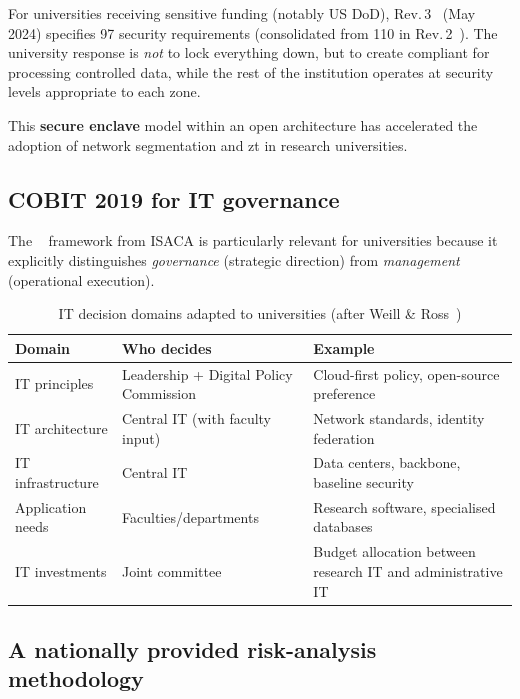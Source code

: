 For universities receiving sensitive funding (notably
US DoD),  Rev.\,3~\cite{nist-171r3} (May 2024) specifies
97 security requirements (consolidated from 110 in Rev.\,2~\cite{nist-171}). The university response is \emph{not}
to lock everything down, but to create compliant 
for processing controlled data, while the rest of
the institution operates at security levels appropriate to each zone.

This \textbf{secure enclave} model within an open architecture
has accelerated the adoption of network segmentation and \gls{zt}
in research universities.

\subsection{COBIT 2019 for IT governance}

The ~\cite{cobit} framework from ISACA is
particularly relevant for universities because it explicitly
distinguishes \emph{governance} (strategic direction) from
\emph{management} (operational execution).

\begin{table}[H]
\centering
\caption{IT decision domains adapted to universities (after Weill
\& Ross~\cite{weill-ross})}
\label{tab:cobit}
\small
\begin{tabularx}{\textwidth}{l l X}
\toprule
\textbf{Domain} & \textbf{Who decides} & \textbf{Example} \\
\midrule
IT principles & Leadership + Digital Policy Commission & Cloud-first policy,
    open-source preference \\
\addlinespace
IT architecture & Central IT (with faculty input) & Network standards,
    identity federation \\
\addlinespace
IT infrastructure & Central IT & Data centers, backbone, baseline security \\
\addlinespace
Application needs & Faculties/departments & Research software, specialised
    databases \\
\addlinespace
IT investments & Joint committee & Budget allocation between research IT
    and administrative IT \\
\bottomrule
\end{tabularx}
\end{table}

\subsection{A nationally provided risk-analysis methodology}

